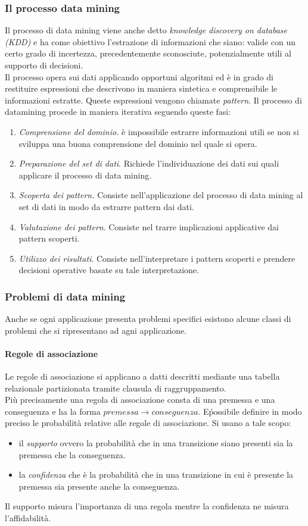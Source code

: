 \subsubsection{Il processo data mining}
Il processo di data mining viene anche detto \emph{knowledge discovery on database (KDD)} e ha come obiettivo l'estrazione di informazioni che siano: valide con un certo grado di incertezza, precedentemente sconosciute, potenzialmente utili al supporto di decisioni.\\
Il processo opera sui dati applicando opportuni algoritmi ed è in grado di restituire espressioni che descrivono in maniera sintetica e comprensibile le informazioni estratte. Queste espressioni vengono chiamate \emph{pattern}.
Il processo di datamining procede in maniera iterativa seguendo queste fasi:
\begin{enumerate}
\item \emph{Comprensione del dominio.} è impossibile estrarre informazioni utili se non si sviluppa una buona comprensione del dominio nel quale si opera.
\item \emph{Preparazione del set di dati}. Richiede l'individuazione dei dati sui quali applicare il processo di data mining.
\item \emph{Scoperta dei pattern.} Consiste nell'applicazione del processo di data mining al set di dati in modo da estrarre pattern dai dati.
\item \emph{Valutazione dei pattern}. Consiste nel trarre implicazioni applicative dai pattern scoperti.
\item \emph{Utilizzo dei risultati}. Consiste nell'interpretare i pattern scoperti e prendere decisioni operative basate su tale interpretazione.
\end{enumerate}
\subsubsection{Problemi di data mining} 
Anche se ogni applicazione presenta problemi specifici esistono alcune classi di problemi che si ripresentano ad agni applicazione.
\paragraph{Regole di associazione} Le regole di associazione si applicano a datti descritti mediante una tabella relazionale partizionata tramite clausula di raggruppamento.\\ 
Più precisamente una regola di associazione consta di una premessa e una conseguenza e ha la forma $premessa\rightarrow conseguenza$.
E\' possibile definire in modo preciso le probabilità relative alle regole di associazione. Si usano a tale scopo:
\begin{itemize}
\item il \emph{supporto} ovvero la probabilità che in una transizione siano presenti sia la premessa che la conseguenza.
\item la \emph{confidenza} che è la probabilità che in una transizione in cui è presente la premessa sia presente anche la conseguenza.
\end{itemize}
Il supporto misura l'importanza di una regola mentre la confidenza ne misura l'affidabilità.
